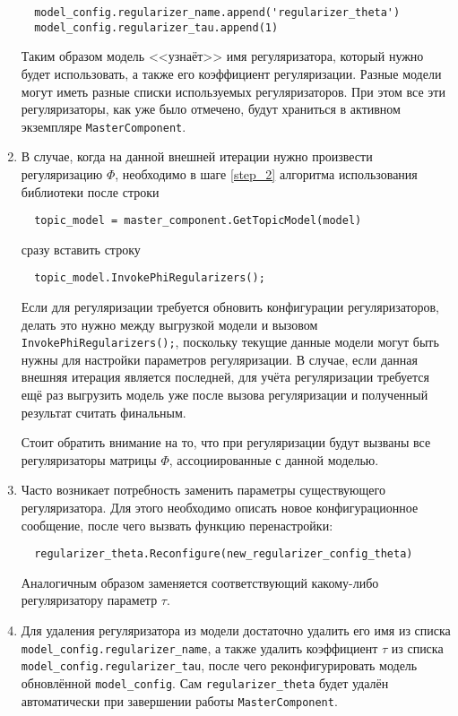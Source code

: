 \begin{enumerate}
	\vspace{4pt}	
	\verb|  model_config.regularizer_name.append('regularizer_theta')| \\
	\verb|  model_config.regularizer_tau.append(1)|
	\vspace{4pt}	
		
	Таким образом модель <<узнаёт>> имя регуляризатора, который нужно будет использовать, а также его коэффициент регуляризации. Разные модели могут иметь разные списки используемых регуляризаторов. При этом все эти регуляризаторы, как уже было отмечено, будут храниться в активном экземпляре \verb|MasterComponent|.
	
	\item В случае, когда на данной внешней итерации нужно произвести регуляризацию $\Phi$, необходимо в шаге \ref{step_2} алгоритма использования библиотеки после строки
	
	\vspace{4pt}	
	\verb|  topic_model = master_component.GetTopicModel(model)|
	\vspace{4pt}	
	
	сразу вставить строку 
	
	\vspace{4pt}	
	\verb|  topic_model.InvokePhiRegularizers();|
	\vspace{4pt}		
	
	Если для регуляризации требуется обновить конфигурации регуляризаторов, делать это нужно между выгрузкой модели и вызовом \verb|InvokePhiRegularizers();|, поскольку текущие данные модели могут быть нужны для настройки параметров регуляризации. В случае, если данная внешняя итерация является последней, для учёта регуляризации требуется ещё раз выгрузить модель уже после вызова регуляризации и полученный результат считать финальным.
	
	Стоит обратить внимание на то, что при регуляризации будут вызваны все регуляризаторы матрицы $\Phi$, ассоциированные с данной моделью.
	
	\item Часто возникает потребность заменить параметры существующего регуляризатора. Для этого необходимо описать новое конфигурационное сообщение, после чего вызвать функцию перенастройки:
	
	\vspace{4pt}	
	\verb|  regularizer_theta.Reconfigure(new_regularizer_config_theta)|
	\vspace{4pt}
	
	Аналогичным образом заменяется соответствующий какому-либо регуляризатору параметр $\tau$.
	
	\item Для удаления регуляризатора из модели достаточно удалить его имя из списка \verb|model_config.regularizer_name|, а также удалить коэффициент $\tau$ из списка \verb|model_config.regularizer_tau|, после чего реконфигурировать модель обновлённой \verb|model_config|. Сам \verb|regularizer_theta| будет удалён автоматически при завершении работы \verb|MasterComponent|.
	
\end{enumerate}

